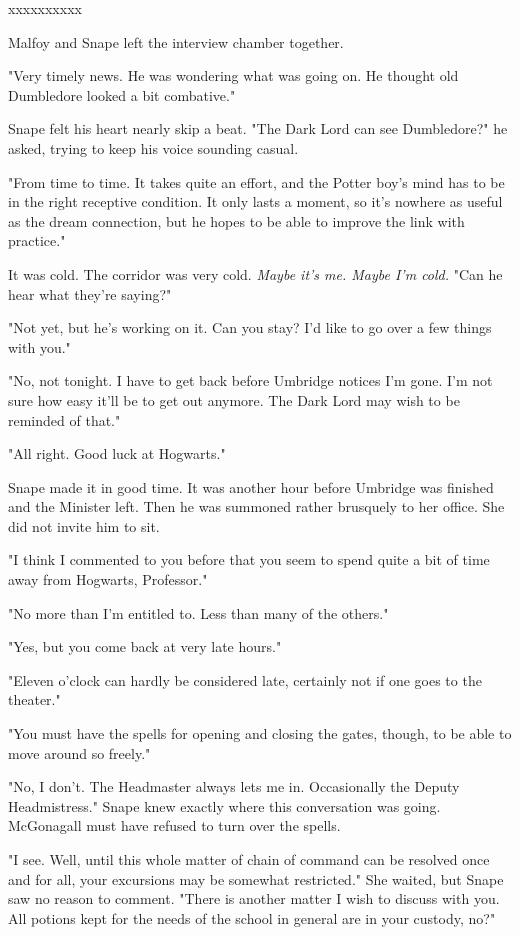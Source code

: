 \documentclass[a4paper,11pt]{article}
\begin{document}
xxxxxxxxxx

Malfoy and Snape left the interview chamber together.

"Very timely news. He was wondering what was going on. He thought old Dumbledore looked a bit combative."

Snape felt his heart nearly skip a beat. "The Dark Lord can see Dumbledore?" he asked, trying to keep his voice sounding casual.

"From time to time. It takes quite an effort, and the Potter boy's mind has to be in the right receptive condition. It only lasts a moment, so it's nowhere as useful as the dream connection, but he hopes to be able to improve the link with practice."

It was cold. The corridor was very cold. \emph{Maybe it's me. Maybe I'm cold.} "Can he hear what they're saying?"

"Not yet, but he's working on it. Can you stay? I'd like to go over a few things with you."

"No, not tonight. I have to get back before Umbridge notices I'm gone. I'm not sure how easy it'll be to get out anymore. The Dark Lord may wish to be reminded of that."

"All right. Good luck at Hogwarts."

Snape made it in good time. It was another hour before Umbridge was finished and the Minister left. Then he was summoned rather brusquely to her office. She did not invite him to sit.

"I think I commented to you before that you seem to spend quite a bit of time away from Hogwarts, Professor."

"No more than I'm entitled to. Less than many of the others."

"Yes, but you come back at very late hours."

"Eleven o'clock can hardly be considered late, certainly not if one goes to the theater."

"You must have the spells for opening and closing the gates, though, to be able to move around so freely."

"No, I don't. The Headmaster always lets me in. Occasionally the Deputy Headmistress." Snape knew exactly where this conversation was going. McGonagall must have refused to turn over the spells.

"I see. Well, until this whole matter of chain of command can be resolved once and for all, your excursions may be somewhat restricted." She waited, but Snape saw no reason to comment. "There is another matter I wish to discuss with you. All potions kept for the needs of the school in general are in your custody, no?"
\end{document}
